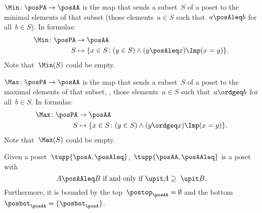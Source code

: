 \begin{definition}[Min]
  \label{def:Min}
  $\Min \colon \posPA \to \posAA$ is the map that sends a subset~$S$ of a poset to the minimal elements of that subset (those elements~$a \in S$ such that~$a \posAleq b$ for all~$b \in S$).
  In formulas:
  \begin{equation*}
    \begin{aligned}
      \Min \colon \posPA &\to \posAA\\
      S&\mapsto \{ x\in S\colon (y\in S)\wedge(y\posAleq x)\Imp (x=y)\}.
    \end{aligned}
  \end{equation*}
  Note that~$\Min(S)$ could be empty.
\end{definition}

\begin{definition}[Max]
  \label{def:Max}
  $\Max \colon \posPA \to \posAA$ is the map that sends a subset~$S$ of a poset to the maximal elements of that subset, \ie , those elements~$a \in S$ such that~$a \ordgeq b$ for all~$b \in S$. In formulas:
  \begin{equation*}
    \begin{aligned}
      \Max \colon \posPA &\to \posAA\\
      S&\mapsto \{ x\in S\colon (y\in S)\wedge(y\ordgeq x)\Imp (x=y)\}.
    \end{aligned}
  \end{equation*}
  Note that~$\Max(S)$ could be empty.
\end{definition}


\begin{lemma}\label{lem:orderantichain}
  Given a poset~$\tupp{\posA,\posAleq}$,~$\tupp{\posAA,\posAAleq}$ is a poset with
  \begin{equation}
    \label{eq:orderantichain}
    A\posAAleq B \text{ if and only if } \upit  A \supseteq \ \upit  B.
  \end{equation}
  Furthermore, it is bounded by the top~$\postop_{\posAA}=\emptyset$ and the bottom~$\posbot_{\posAA}=\{\posbot_{\posA}\}$.
\end{lemma}


